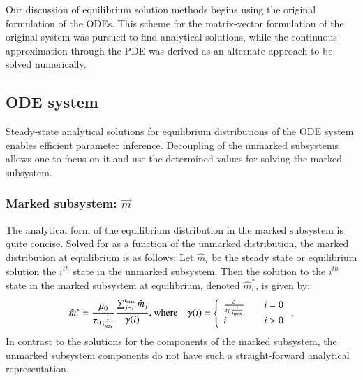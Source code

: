 \documentclass[review]{elsarticle}
\newcommand{\imax}{\ensuremath{i_{\max}}\xspace}
\newcommand{\mstarvec}{\ensuremath{\vec{m}}\xspace}
\begin{document}
Our discussion of equilibrium solution methods begins using the original formulation of the ODEs.
This scheme for the matrix-vector formulation of the original system was pursued to find analytical solutions, while the continuous approximation through the PDE was derived as an alternate approach to be solved numerically.  %

\subsection{ODE system}
Steady-state analytical solutions for equilibrium distributions of the ODE system enables efficient parameter inference.
Decoupling of the unmarked subsystems allows one to focus on it and use the determined values for solving the marked subsystem.  
\subsubsection{Marked subsystem: \mstarvec}
The analytical form of the equilibrium distribution in the marked subsystem is quite concise.
Solved for as a function of the unmarked distribution, the marked distribution at equilibrium is as follows:
Let $\hat{m}_{i}$ be the steady state or equilibrium solution the $i^{th}$ state in the unmarked subsystem.
Then the solution to the $i^{th}$ state in the marked subsystem at equilibrium, denoted $\hat{m}_{i}^{*}$, is given by:
\begin{equation}\label{eq:anyl_marked_eq}
\hat{m}_{i}^{*} = \frac{\mu_0}{\tau_0\frac{1}{\imax}}\frac{\sum_{j=i}^{\imax}\hat{m}_{j}}{\gamma (i)} \text{, where\quad}
\gamma (i) = \left\{
        \begin{array}{ll}
            \frac{\delta}{\tau_0\frac{1}{\imax}} & \quad i = 0 \\
            i & \quad i > 0
        \end{array}
    \right. .
\end{equation} 
In contrast to the solutions for the components of the marked subsystem, the unmarked subsystem components do not have such a straight-forward analytical representation.
\end{document}
